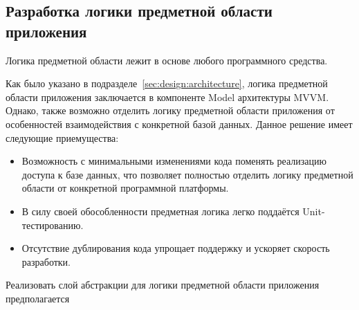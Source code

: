 \subsection{Разработка логики предметной области приложения}
\label{sec:design:business}

Логика предметной области лежит в основе любого программного средства.

Как было указано в подразделе~\ref{sec:design:architecture}, логика предметной области приложения заключается в компоненте Model архитектуры MVVM.
Однако, также возможно отделить логику предметной области приложения от особенностей взаимодействия с конкретной базой данных.
Данное решение имеет следующие приемущества:
\begin{itemize}
    \item Возможность с минимальными изменениями кода поменять реализацию доступа к базе данных, что позволяет полностью отделить логику предметной области от конкретной программной платформы.
    \item В силу своей обособленности предметная логика легко поддаётся Unit-тестированию.
    \item Отсутствие дублирования кода упрощает поддержку и ускоряет скорость разработки.
\end{itemize}

Реализовать слой абстракции для логики предметной области приложения предполагается